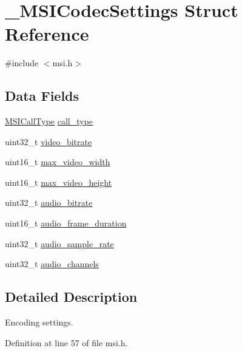 \hypertarget{struct___m_s_i_codec_settings}{\section{\+\_\+\+M\+S\+I\+Codec\+Settings Struct Reference}
\label{struct___m_s_i_codec_settings}
}


{\ttfamily \#include $<$msi.\+h$>$}

\subsection*{Data Fields}
\begin{DoxyCompactItemize}
\item 
\hyperlink{msi_8h_a54df3a97d8d112a3a4a6476c9f9284a6}{M\+S\+I\+Call\+Type} \hyperlink{struct___m_s_i_codec_settings_a24d841d0ab8a0b3f12f559aec494e4fe}{call\+\_\+type}
\item 
uint32\+\_\+t \hyperlink{struct___m_s_i_codec_settings_af0eac99d4181795e8a595d244e745192}{video\+\_\+bitrate}
\item 
uint16\+\_\+t \hyperlink{struct___m_s_i_codec_settings_ab81ecded1f7c46e120c8f2afa7b2c5cc}{max\+\_\+video\+\_\+width}
\item 
uint16\+\_\+t \hyperlink{struct___m_s_i_codec_settings_a4fef4b2fa1a8ae8446314ad0af4ce698}{max\+\_\+video\+\_\+height}
\item 
uint32\+\_\+t \hyperlink{struct___m_s_i_codec_settings_a5d9a8b59b2eb1eef8dbdcb032bf1dd01}{audio\+\_\+bitrate}
\item 
uint16\+\_\+t \hyperlink{struct___m_s_i_codec_settings_a61b592233f5a65705eb2600d38e365cd}{audio\+\_\+frame\+\_\+duration}
\item 
uint32\+\_\+t \hyperlink{struct___m_s_i_codec_settings_a66da4482e934a2700e07a39fa0838559}{audio\+\_\+sample\+\_\+rate}
\item 
uint32\+\_\+t \hyperlink{struct___m_s_i_codec_settings_a1b04e9669a2929f425e867440b6d826d}{audio\+\_\+channels}
\end{DoxyCompactItemize}


\subsection{Detailed Description}
Encoding settings. 

Definition at line 57 of file msi.\+h.



